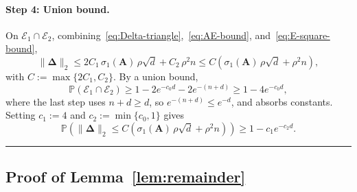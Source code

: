 \documentclass{article}
\newcommand{\twonorm}[1]{\|#1\|_2}
\newcommand{\pr}[1]{\mbox{}\mathbb{P}\left(#1\right)}
\newcommand{\Ab}{\mathbf{A}}
\newcommand{\Ecal}{\mathcal{E}}
\newcommand{\BlackBox}{\rule{1.5ex}{1.5ex}}  %
\newenvironment{proof}{\par\noindent{\bf Proof\ }}{\hfill\BlackBox\par\medskip}
\newcommand{\rbr}[1]{\left(#1\right)}
\newcommand{\Deltab}{\boldsymbol{\Delta}}
\begin{document}
\begin{proof}
\paragraph{Step 4: Union bound.}
On $\Ecal_1 \cap \Ecal_2$, combining~\eqref{eq:Delta-triangle},~\eqref{eq:AE-bound}, and~\eqref{eq:E-square-bound},
\begin{equation*}
    \twonorm{\Deltab} \le 2 C_1\,\sigma_1(\Ab)\,\rho\sqrt{d} + C_2\,\rho^2 n \le C\rbr{\sigma_1(\Ab)\,\rho\sqrt{d} + \rho^2 n},
\end{equation*}
with $C := \max\{2 C_1, C_2\}$. By a union bound,
\begin{equation*}
    \pr{\Ecal_1 \cap \Ecal_2} \ge 1 - 2 e^{-c_0 d} - 2 e^{-(n+d)} \ge 1 - 4 e^{-c_0 d},
\end{equation*}
where the last step uses $n+d \ge d$, so $e^{-(n+d)} \le e^{-d}$, and absorbs constants. Setting $c_1 := 4$ and $c_2 := \min\{c_0, 1\}$ gives
\begin{equation*}
    \pr{\twonorm{\Deltab} \le C\rbr{\sigma_1(\Ab)\,\rho\sqrt{d} + \rho^2 n}} \ge 1 - c_1 e^{-c_2 d}.
\end{equation*}
\end{proof}

\subsection{Proof of Lemma~\ref{lem:remainder}}\label{app:remainder}
\end{document}
